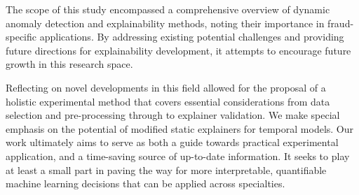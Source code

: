 The scope of this study encompassed a comprehensive overview of dynamic anomaly detection and explainability methods, noting their importance in fraud-specific applications. By addressing existing potential challenges and providing future directions for explainability development, it attempts to encourage future growth in this research space.

Reflecting on novel developments in this field allowed for the proposal of a holistic experimental method that covers essential considerations from data selection and pre-processing through to explainer validation. We make special emphasis on the potential of modified static explainers for temporal models. Our work ultimately aims to serve as both a guide towards practical experimental application, and a time-saving source of up-to-date information. It seeks to play at least a small part in paving the way for more interpretable, quantifiable machine learning decisions that can be applied across specialties.